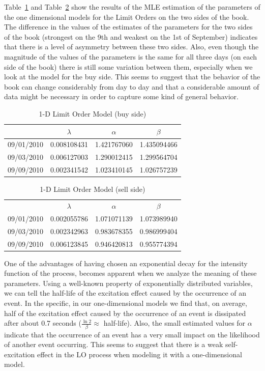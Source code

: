 Table~\ref{tab:limmodbuy} and Table~\ref{tab:limmodsell} show the results of the MLE estimation of the parameters of the one dimensional models for the Limit Orders on the two sides of the book. The difference in the values of the estimates of the parameters for the two sides of the book (strongest on the 9th and weakest on the 1st of September) indicates that there is a level of asymmetry between these two sides. Also, even though the magnitude of the values of the parameters is the same for all three days (on each side of the book) there is still some variation between them, especially when we look at the model for the buy side. This seems to suggest that the behavior of the book can change considerably from day to day and that a considerable amount of data might be necessary in order to capture some kind of general behavior. 
	\begin{table}
	\centering
	\caption{1-D Limit Order Model (buy side) \label{tab:limmodbuy}}
	\begin{tabular}{c|ccc} 
		& $\lambda$ & $\alpha$  & $\beta$ \\ \hline
	09/01/2010 & 0.008108431 & 1.421767060 & 1.435094466 \\
	09/03/2010 & 0.006127003 & 1.290012415 & 1.299564704 \\
	09/09/2010 & 0.002341542 & 1.023410145 & 1.026757239
	\end{tabular}
	\end{table}
	\begin{table}
	\centering
	\caption{1-D Limit Order Model (sell side) \label{tab:limmodsell}}
	\begin{tabular}{c|ccc} 
		& $\lambda$ & $\alpha$ & $\beta$ \\
	09/01/2010 & 0.002055786 & 1.071071139 & 1.073989940 \\
	09/03/2010 & 0.002342963 & 0.983678355 & 0.986999404 \\
	09/09/2010 & 0.006123845 & 0.946420813 & 0.955774394
	\end{tabular}
	\end{table}


One of the advantages of having chosen an exponential decay for the intensity function of the process, becomes apparent when we analyze the meaning of these parameters. Using a well-known property of exponentially distributed variables, we can tell the half-life of the excitation effect caused by the occurrence of an event. In the specific, in our one-dimensional models we find that, on average, half of the excitation effect caused by the occurrence of an event is dissipated after about 0.7 seconds ($\frac{\ln 2}{\beta} \approx$ half-life). Also, the small estimated values for $\alpha$ indicate that the occurrence of an event has a very small impact on the likelihood of another event occurring. This seems to suggest that there is a weak self-excitation effect in the LO process when modeling it with a one-dimensional model. 


